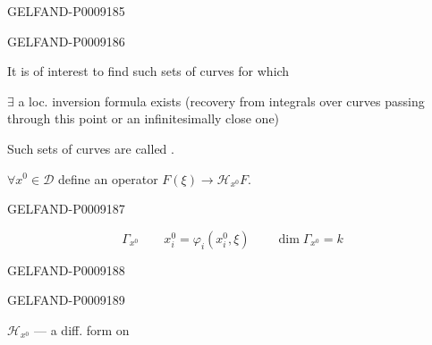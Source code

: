 \begin{GelfandAdjacentEvidence}{GELFAND-P000918}{5}

\end{GelfandAdjacentEvidence}
\begin{GelfandAdjacentEvidence}{GELFAND-P000918}{6}


It is of interest to find such sets of curves for which

\(\exists\) a loc. inversion formula exists (recovery from integrals over curves passing through this point or an infinitesimally close one)

Such sets of curves are called .

$\forall x^0\in\mathcal D$ define an operator \(F(\xi)\longrightarrow\mathcal H_{x^0}F\).
\end{GelfandAdjacentEvidence}
\begin{GelfandAdjacentEvidence}{GELFAND-P000918}{7}


\begin{equation*}
 \Gamma_{x^0}\qquad x_i^0=\varphi_i(x_i^0,\xi)
 \qquad\dim\Gamma_{x^0}=k
\end{equation*}
\end{GelfandAdjacentEvidence}
\begin{GelfandAdjacentEvidence}{GELFAND-P000918}{8}

\end{GelfandAdjacentEvidence}
\begin{GelfandAdjacentEvidence}{GELFAND-P000918}{9}


\(\mathcal H_{x^0}\) --- a diff. form on
\end{GelfandAdjacentEvidence}
